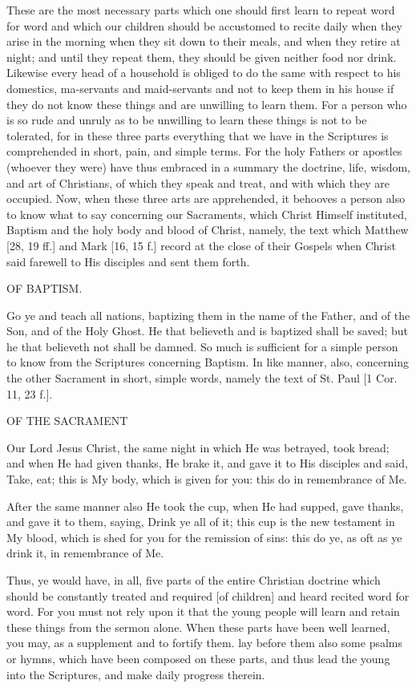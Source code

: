 These are the most necessary parts which one should first learn to
repeat word for word and which our children should be accustomed to
recite daily when they arise in the morning when they sit down to their
meals, and when they retire at night; and until they repeat them, they
should be given neither food nor drink. Likewise every head of a
household is obliged to do the same with respect to his domestics,
ma-servants and maid-servants and not to keep them in his house if they
do not know these things and are unwilling to learn them. For a person
who is so rude and unruly as to be unwilling to learn these things is
not to be tolerated, for in these three parts everything that we have
in the Scriptures is comprehended in short, pain, and simple terms. For
the holy Fathers or apostles (whoever they were) have thus embraced in
a summary the doctrine, life, wisdom, and art of Christians, of which
they speak and treat, and with which they are occupied. Now, when these
three arts are apprehended, it behooves a person also to know what to
say concerning our Sacraments, which Christ Himself instituted, Baptism
and the holy body and blood of Christ, namely, the text which Matthew
[28, 19 ff.] and Mark [16, 15 f.] record at the close of their Gospels
when Christ said farewell to His disciples and sent them forth.

OF BAPTISM.

Go ye and teach all nations, baptizing them in the name of the Father,
and of the Son, and of the Holy Ghost. He that believeth and is
baptized shall be saved; but he that believeth not shall be damned. So
much is sufficient for a simple person to know from the Scriptures
concerning Baptism. In like manner, also, concerning the other
Sacrament in short, simple words, namely the text of St. Paul [1 Cor.
11, 23 f.].

OF THE SACRAMENT

Our Lord Jesus Christ, the same night in which He was betrayed, took
bread; and when He had given thanks, He brake it, and gave it to His
disciples and said, Take, eat; this is My body, which is given for you:
this do in remembrance of Me.

After the same manner also He took the cup, when He had supped, gave
thanks, and gave it to them, saying, Drink ye all of it; this cup is
the new testament in My blood, which is shed for you for the remission
of sins: this do ye, as oft as ye drink it, in remembrance of Me.

Thus, ye would have, in all, five parts of the entire Christian
doctrine which should be constantly treated and required [of children]
and heard recited word for word. For you must not rely upon it that the
young people will learn and retain these things from the sermon alone.
When these parts have been well learned, you may, as a supplement and
to fortify them. lay before them also some psalms or hymns, which have
been composed on these parts, and thus lead the young into the
Scriptures, and make daily progress therein.

